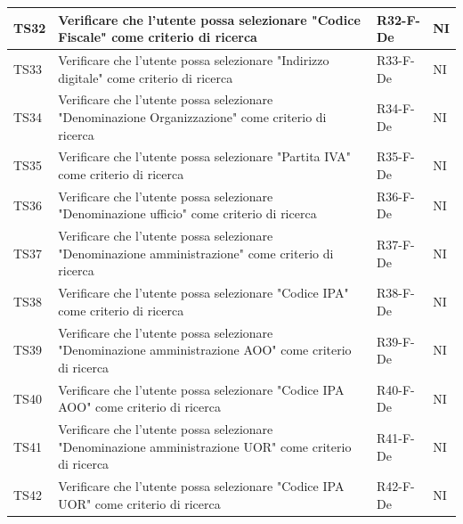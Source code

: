 \documentclass[a4paper,12pt]{article}
\begin{document}
\begin{longtable}{|M{1.2cm}|M{6.3cm}|M{2.5cm}|M{1.5cm}|}
                TS32 & Verificare che l'utente possa selezionare "Codice Fiscale" come criterio di ricerca & R32-F-De & NI \\
                \hline

                TS33 & Verificare che l'utente possa selezionare "Indirizzo digitale" come criterio di ricerca & R33-F-De & NI \\
                \hline

                TS34 & Verificare che l'utente possa selezionare "Denominazione Organizzazione" come criterio di ricerca & R34-F-De & NI \\
                \hline

                TS35 & Verificare che l'utente possa selezionare "Partita IVA" come criterio di ricerca & R35-F-De & NI \\
                \hline

                TS36 & Verificare che l'utente possa selezionare "Denominazione ufficio" come criterio di ricerca & R36-F-De & NI \\
                \hline

                TS37 & Verificare che l'utente possa selezionare "Denominazione amministrazione" come criterio di ricerca & R37-F-De & NI \\
                \hline

                TS38 & Verificare che l'utente possa selezionare "Codice IPA" come criterio di ricerca & R38-F-De & NI \\
                \hline

                TS39 & Verificare che l'utente possa selezionare "Denominazione amministrazione AOO" come criterio di ricerca & R39-F-De & NI \\
                \hline

                TS40 & Verificare che l'utente possa selezionare "Codice IPA AOO" come criterio di ricerca & R40-F-De & NI \\
                \hline

                TS41 & Verificare che l'utente possa selezionare "Denominazione amministrazione UOR" come criterio di ricerca & R41-F-De & NI \\
                \hline

                TS42 & Verificare che l'utente possa selezionare "Codice IPA UOR" come criterio di ricerca & R42-F-De & NI \\
                \hline


\end{longtable}
\end{document}
